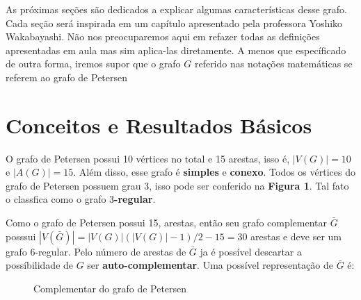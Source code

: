 \documentclass[11pt,a4paper]{exam}
\begin{document}
As próximas seções são dedicados a explicar algumas características
desse grafo. Cada seção será inspirada em um capítulo apresentado pela
professora Yoshiko Wakabayashi. Não nos preocuparemos aqui em refazer
todas as definições apresentadas em aula mas sim aplica-las diretamente.
A menos que específicado de outra forma, iremos supor que o grafo $G$
referido nas notações matemáticas se referem ao grafo de Petersen

\section{Conceitos e Resultados Básicos}
O grafo de Petersen possui 10 vértices no total e 15 arestas, isso é,
$|V(G)| = 10$ e $|A(G)| = 15$. Além disso, esse grafo é \textbf{simples} e
\textbf{conexo}.  Todos os vértices do grafo de Petersen
possuem grau 3, isso pode ser conferido na \textbf{Figura 1}. Tal fato o
classfica como o grafo \textbf{$3$-regular}.
\par Como o grafo de Petersen possui 15, arestas, então seu grafo
complementar $\bar{G}$ posssui $|V(\bar{G})|=|V(G)|(|V(G)|-1)/2 -15 = 30$ arestas e deve ser um
grafo $6$-regular. Pelo número de arestas de $\bar{G}$ ja é possível
descartar a possíbilidade de $G$ ser \textbf{auto-complementar}. Uma possível
representação de $\bar{G}$ é:
\begin{figure}[H]
    \centering
    \caption{Complementar do grafo de Petersen}
\end{figure}
\end{document}
